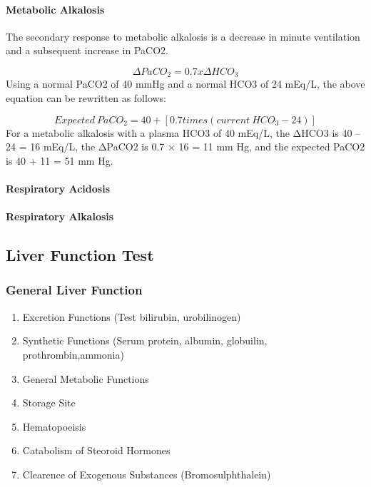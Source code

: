\documentclass[
  letterpaper,
  DIV=11,
  numbers=noendperiod]{scrreprt}
\let\oldparagraph\paragraph
\renewcommand{\paragraph}[1]{\oldparagraph{#1}\mbox{}}
\providecommand{\tightlist}{%
  \setlength{\itemsep}{0pt}\setlength{\parskip}{0pt}}\usepackage{longtable,booktabs,array}
\begin{document}
\paragraph{Metabolic Alkalosis}\label{metabolic-alkalosis-1}

The secondary response to metabolic alkalosis is a decrease in minute
ventilation and a subsequent increase in PaCO2.

\[
\Delta PaCO_2 = 0.7 x \Delta HCO_3
\] Using a normal PaCO2 of 40 mmHg and a normal HCO3 of 24 mEq/L, the
above equation can be rewritten as follows:

\[
Expected \ PaCO_2 = 40 + [0.7 times (current \ HCO_3 - 24)] 
\] For a metabolic alkalosis with a plasma HCO3 of 40 mEq/L, the ΔHCO3
is 40 -- 24 = 16 mEq/L, the ΔPaCO2 is 0.7 × 16 = 11 mm Hg, and the
expected PaCO2 is 40 + 11 = 51 mm Hg.

\paragraph{Respiratory Acidosis}\label{respiratory-acidosis-1}

\paragraph{Respiratory Alkalosis}\label{respiratory-alkalosis-1}

\subsection{Liver Function Test}\label{liver-function-test}

\subsubsection{General Liver Function}\label{general-liver-function}

\begin{enumerate}
\def\labelenumi{\arabic{enumi}.}
\tightlist
\item
  Excretion Functions (Test bilirubin, urobilinogen)
\item
  Synthetic Functions (Serum protein, albumin, globuilin,
  prothrombin,ammonia)
\item
  General Metabolic Functions
\item
  Storage Site
\item
  Hematopoeisis
\item
  Catabolism of Steoroid Hormones
\item
  Clearence of Exogenous Substances (Bromosulphthalein)
\end{enumerate}
\end{document}
